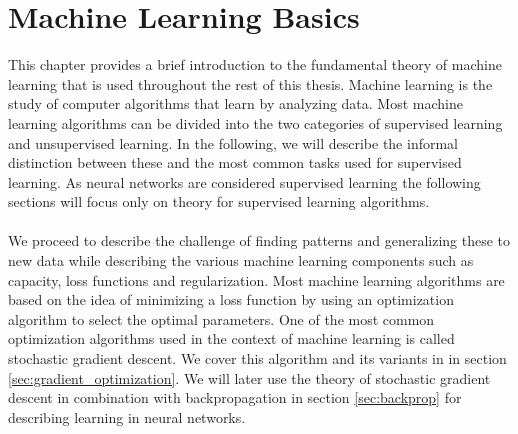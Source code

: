 \chapter{Machine Learning Basics}\label{sec:ml_basic}
This chapter provides a brief introduction to the fundamental theory of machine learning that is used throughout the rest of this thesis. 
Machine learning is the study of computer algorithms that learn by analyzing data. Most machine learning algorithms can be divided into the two categories of supervised learning and unsupervised learning. In the following, we will describe the informal distinction between these and the most common tasks used for supervised learning. As neural networks are considered supervised learning the following sections will focus only on theory for supervised learning algorithms.
\\
\\
We proceed to describe the challenge of finding patterns and generalizing these to new data while describing the various machine learning components such as capacity, loss functions and regularization. Most machine learning algorithms are based on the idea of minimizing a loss function by using an optimization algorithm to select the optimal parameters. One of the most common optimization algorithms used in the context of machine learning is called stochastic gradient descent. We cover this algorithm and its variants in in section \ref{sec:gradient_optimization}. We will later use the theory of stochastic gradient descent in combination with backpropagation in section \ref{sec:backprop} for describing learning in neural networks.




